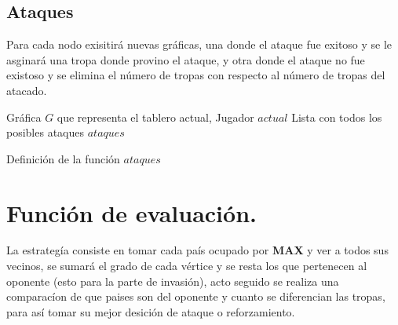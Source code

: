 \documentclass[12pt]{article}
\begin{document}
\subsection{Ataques}

Para cada nodo exisitir\'a nuevas gr\'aficas, una donde el ataque fue exitoso y se le asginar\'a una tropa donde
provino el ataque, y otra donde el ataque no fue existoso y se elimina el n\'umero de tropas con respecto al n\'umero
de tropas del atacado.

\begin{algorithm}
\begin{algorithmic}[1]
\REQUIRE Gr\'afica $G$ que representa el tablero actual, Jugador $actual$
\ENSURE Lista con todos los posibles ataques
\ENDFOR
{}
\ELSE
{}
\ENDIF
\ENDIF
\ENDIF
{}
\ENDIF
\ENDFOR
\ENDWHILE
\RETURN $ataques$
\end{algorithmic}
\caption{Definici\'on de la funci\'on $ataques$}
\label{ataques}
\end{algorithm}

\section{Funci\'on de evaluaci\'on.}

La estrateg\'ia consiste en tomar cada pa\'is ocupado por \textbf{MAX} y ver a todos sus vecinos,
se sumar\'a el grado de cada v\'ertice y se resta los que pertenecen al oponente (esto para la parte de invasi\'on), acto seguido
se realiza una comparac\'ion de que paises son del oponente y cuanto se diferencian las tropas, para así tomar su
mejor desici\'on de ataque o reforzamiento.
\end{document}
